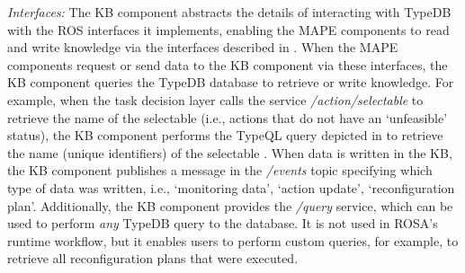 \par\medskip\noindent\begin{minipage}{\linewidth}
\captionsetup{type=listing}
\caption{TypeQL rule to infer whether a component is in `configuration error'}%
\label{lst:rules}
\end{minipage}\par\medskip

\textit{Interfaces:}
The KB component abstracts the details of interacting with TypeDB with the ROS interfaces it implements, enabling the MAPE components to read and write knowledge via the interfaces described in .
When the MAPE components request or send data to the KB component via these interfaces, the KB component queries the TypeDB database to retrieve or write knowledge. For example, when the task decision layer calls the service \emph{/action/selectable} to retrieve the name of the selectable  (i.e., actions that do not have an `unfeasible' status), the KB component performs the TypeQL query depicted in  to retrieve the name (unique identifiers) of the selectable .
When data is written in the KB, the KB component publishes a message in the \emph{/events} topic specifying which type of data was written, i.e., `monitoring data', `action update', `reconfiguration plan'. Additionally, the KB component provides the \emph{/query} service, which can be used to perform \emph{any} TypeDB query to the database. It is not used in ROSA's runtime workflow, but it enables users to perform custom queries, for example, to retrieve all reconfiguration plans that were executed.

